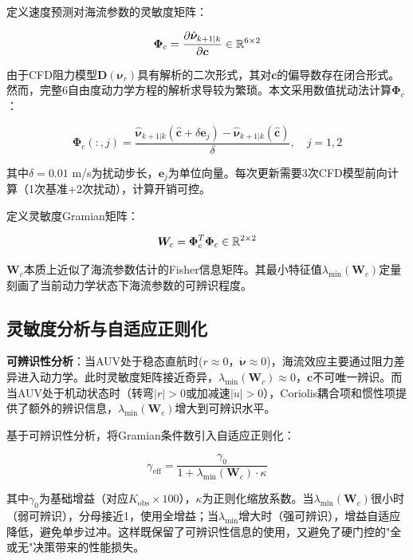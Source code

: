 定义速度预测对海流参数的灵敏度矩阵：

\begin{equation}
    \bm{\Phi}_c = \frac{\partial \hat{\bm{\nu}}_{k+1|k}}{\partial \bm{c}} \in \mathbb{R}^{6\times 2}
    \label{eq:sensitivity}
\end{equation}

由于CFD阻力模型$\bm{D}(\bm{\nu}_r)$具有解析的二次形式，其对$\bm{c}$的偏导数存在闭合形式。然而，完整6自由度动力学方程的解析求导较为繁琐。本文采用数值扰动法计算$\bm{\Phi}_c$：

\begin{equation}
    \bm{\Phi}_c(:,j) = \frac{\hat{\bm{\nu}}_{k+1|k}(\hat{\bm{c}}+\delta\bm{e}_j) - \hat{\bm{\nu}}_{k+1|k}(\hat{\bm{c}})}{\delta}, \quad j=1,2
    \label{eq:numerical_phi}
\end{equation}

其中$\delta=0.01$ m/s为扰动步长，$\bm{e}_j$为单位向量。每次更新需要3次CFD模型前向计算（1次基准+2次扰动），计算开销可控。

定义灵敏度Gramian矩阵：

\begin{equation}
    \bm{W}_c = \bm{\Phi}_c^T\bm{\Phi}_c \in \mathbb{R}^{2\times 2}
    \label{eq:gramian}
\end{equation}

$\bm{W}_c$本质上近似了海流参数估计的Fisher信息矩阵。其最小特征值$\lambda_{\min}(\bm{W}_c)$定量刻画了当前动力学状态下海流参数的可辨识程度。

\subsection{灵敏度分析与自适应正则化}

\textbf{可辨识性分析}：当AUV处于稳态直航时($r\approx 0$，$\dot{\bm{\nu}}\approx 0$)，海流效应主要通过阻力差异进入动力学。此时灵敏度矩阵接近奇异，$\lambda_{\min}(\bm{W}_c) \approx 0$，$\bm{c}$不可唯一辨识。而当AUV处于机动状态时（转弯$|r|>0$或加减速$|\dot{u}|>0$），Coriolis耦合项和惯性项提供了额外的辨识信息，$\lambda_{\min}(\bm{W}_c)$增大到可辨识水平。

基于可辨识性分析，将Gramian条件数引入自适应正则化：

\begin{equation}
    \gamma_{\text{eff}} = \frac{\gamma_0}{1 + \lambda_{\min}(\bm{W}_c) \cdot \kappa}
    \label{eq:gate}
\end{equation}

其中$\gamma_0$为基础增益（对应$K_{\text{obs}}\times 100$），$\kappa$为正则化缩放系数。当$\lambda_{\min}(\bm{W}_c)$很小时（弱可辨识），分母接近1，使用全增益；当$\lambda_{\min}$增大时（强可辨识），增益自适应降低，避免单步过冲。这样既保留了可辨识性信息的使用，又避免了硬门控的"全或无"决策带来的性能损失。

